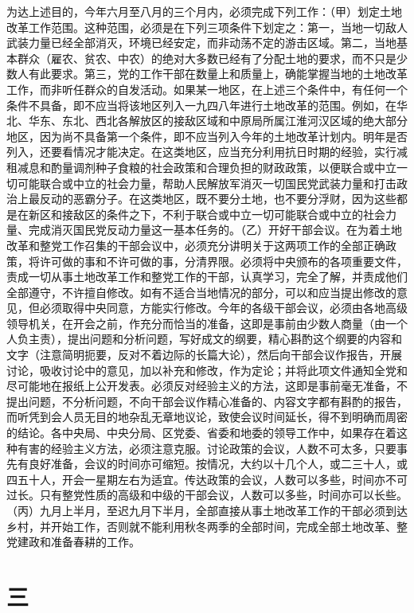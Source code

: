 为达上述目的，今年六月至八月的三个月内，必须完成下列工作：（甲）划定土地改革工作范围。这种范围，必须是在下列三项条件下划定之：第一，当地一切敌人武装力量已经全部消灭，环境已经安定，而非动荡不定的游击区域。第二，当地基本群众（雇农、贫农、中农）的绝对大多数已经有了分配土地的要求，而不只是少数人有此要求。第三，党的工作干部在数量上和质量上，确能掌握当地的土地改革工作，而非听任群众的自发活动。如果某一地区，在上述三个条件中，有任何一个条件不具备，即不应当将该地区列入一九四八年进行土地改革的范围。例如，在华北、华东、东北、西北各解放区的接敌区域和中原局所属江淮河汉区域的绝大部分地区，因为尚不具备第一个条件，即不应当列入今年的土地改革计划内。明年是否列入，还要看情况才能决定。在这类地区，应当充分利用抗日时期的经验，实行减租减息和酌量调剂种子食粮的社会政策和合理负担的财政政策，以便联合或中立一切可能联合或中立的社会力量，帮助人民解放军消灭一切国民党武装力量和打击政治上最反动的恶霸分子。在这类地区，既不要分土地，也不要分浮财，因为这些都是在新区和接敌区的条件之下，不利于联合或中立一切可能联合或中立的社会力量、完成消灭国民党反动力量这一基本任务的。（乙）开好干部会议。在为着土地改革和整党工作召集的干部会议中，必须充分讲明关于这两项工作的全部正确政策，将许可做的事和不许可做的事，分清界限。必须将中央颁布的各项重要文件，责成一切从事土地改革工作和整党工作的干部，认真学习，完全了解，并责成他们全部遵守，不许擅自修改。如有不适合当地情况的部分，可以和应当提出修改的意见，但必须取得中央同意，方能实行修改。今年的各级干部会议，必须由各地高级领导机关，在开会之前，作充分而恰当的准备，这即是事前由少数人商量（由一个人负主责），提出问题和分析问题，写好成文的纲要，精心斟酌这个纲要的内容和文字（注意简明扼要，反对不着边际的长篇大论），然后向干部会议作报告，开展讨论，吸收讨论中的意见，加以补充和修改，作为定论；并将此项文件通知全党和尽可能地在报纸上公开发表。必须反对经验主义的方法，这即是事前毫无准备，不提出问题，不分析问题，不向干部会议作精心准备的、内容文字都有斟酌的报告，而听凭到会人员无目的地杂乱无章地议论，致使会议时间延长，得不到明确而周密的结论。各中央局、中央分局、区党委、省委和地委的领导工作中，如果存在着这种有害的经验主义方法，必须注意克服。讨论政策的会议，人数不可太多，只要事先有良好准备，会议的时间亦可缩短。按情况，大约以十几个人，或二三十人，或四五十人，开会一星期左右为适宜。传达政策的会议，人数可以多些，时间亦不可过长。只有整党性质的高级和中级的干部会议，人数可以多些，时间亦可以长些。（丙）九月上半月，至迟九月下半月，全部直接从事土地改革工作的干部必须到达乡村，并开始工作，否则就不能利用秋冬两季的全部时间，完成全部土地改革、整党建政和准备春耕的工作。

\section*{三}

